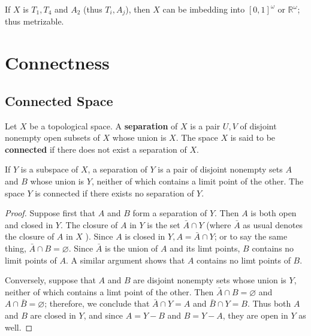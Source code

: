 \documentclass[12pt, a4paper, oneside]{book}
\begin{document}
\begin{theorem}
    If $X$ is $T_1,T_4$ and $A_2$ (thus $T_i,A_j$), then $X$ can be imbedding into $\left[0,1\right]^\omega$ or $\mathbb{R}^\omega$; thus metrizable.
\end{theorem}



\chapter{Connectness}  %
\section{Connected Space} %

\begin{definition}
    Let $X$ be a topological space. A \textbf{separation} of $X$ is a pair $U, V$ of disjoint nonempty open subsets of $X$ whose union is $X$.
    The space $X$ is said to be \textbf{connected} if there does not exist a separation of $X$.
\end{definition}

\begin{theorem}
    If $Y$ is a subspace of $X$, a separation of $Y$ is a pair of disjoint nonempty sets $A$ and $B$ whose union is $Y$, neither of which contains a limit point of the other. The space $Y$ is connected if there exists no separation of $Y$.
    \begin{proof}
        Suppose first that $A$ and $B$ form a separation of $Y$. Then $A$ is both open and closed in $Y$. The closure of $A$ in $Y$ is the set $\bar{A} \cap Y$ (where $\bar{A}$ as usual denotes the closure of $A$ in $X$ ). Since $A$ is closed in $Y, A=\bar{A} \cap Y$; or to say the same thing, $\bar{A} \cap B=\varnothing$. Since $\bar{A}$ is the union of $A$ and its limt points, $B$ contains no limit points of $A$. A similar argument shows that $A$ contains no limt points of $B$.

        Conversely, suppose that $A$ and $B$ are disjoint nonempty sets whose union is $Y$, neither of which contains a limt point of the other. Then $\bar{A} \cap B=\varnothing$ and $A \cap \bar{B}=\varnothing$;
        therefore, we conclude that $\bar{A} \cap Y=A$ and $\bar{B} \cap Y=B$. Thus both $A$ and $B$ are closed in $Y$, and since $A=Y-B$ and $B=Y-A$, they are open in $Y$ as well.
    \end{proof}
\end{theorem}
\end{document}
